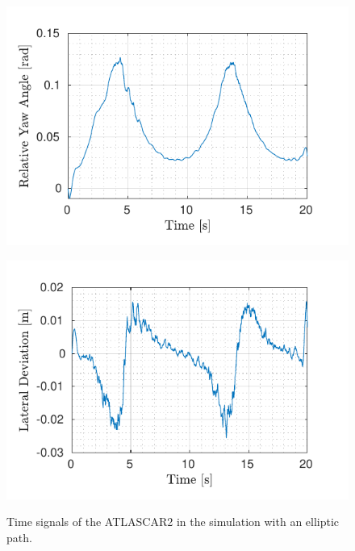 \begin{figure}[!h]
\begin{minipage}[t]{0.5\textwidth}
		\includegraphics[width=\textwidth]{../../MATLAB/lane_following_circular_path/figure/RelativeYawAngleVsTime_circular.pdf}
		\label{fig:relative_yaw_angle_laneFollowing_circular}
	\end{minipage}
	\begin{minipage}[t]{0.5\textwidth}
		\includegraphics[width=\textwidth]{../../MATLAB/lane_following_circular_path/figure/LateralDeviationVsTime_circular.pdf}
		\label{fig:lateral_deviation_laneFollowing_circular}
	\end{minipage}
	\caption{Time signals of the ATLASCAR2 in the simulation with an elliptic path.}
	\label{fig:laneFollowing_signals_circular}
\end{figure}



